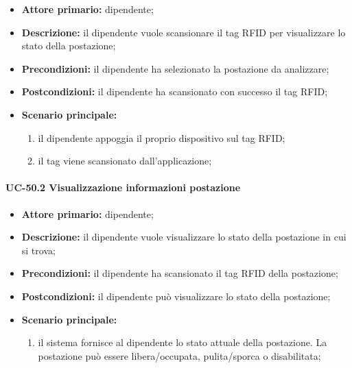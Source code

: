     \begin{itemize}
        \item \textbf{Attore primario:} dipendente;

        \item \textbf{Descrizione:} il dipendente vuole scansionare il tag RFID per visualizzare lo stato della postazione;

        \item \textbf{Precondizioni:} il dipendente ha selezionato la postazione da analizzare;

        \item \textbf{Postcondizioni:} il dipendente ha scansionato con successo il tag RFID;

        \item \textbf{Scenario principale:}
            \begin{enumerate}
                \item il dipendente appoggia il proprio dispositivo sul tag RFID;
                \item il tag viene scansionato dall'applicazione;
            \end{enumerate}
    \end{itemize}

\paragraph{UC-50.2 Visualizzazione informazioni postazione}

\begin{itemize}
    \item \textbf{Attore primario:} dipendente;

    \item \textbf{Descrizione:} il dipendente vuole visualizzare lo stato della postazione in cui si trova;

    \item \textbf{Precondizioni:} il dipendente ha scansionato il tag RFID della postazione;

    \item \textbf{Postcondizioni:} il dipendente può visualizzare lo stato della postazione;

    \item \textbf{Scenario principale:}
        \begin{enumerate}
            \item il sistema fornisce al dipendente lo stato attuale della postazione. La postazione può essere libera/occupata, pulita/sporca o disabilitata;
        \end{enumerate}
\end{itemize}

